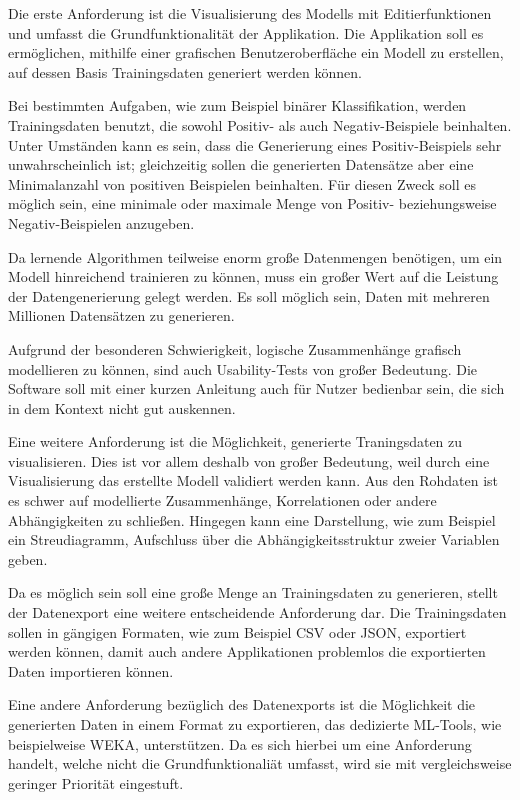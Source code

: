 Die erste Anforderung ist die Visualisierung des Modells mit Editierfunktionen und umfasst die Grundfunktionalität der Applikation. Die Applikation soll es ermöglichen, mithilfe einer grafischen Benutzeroberfläche ein Modell zu erstellen, auf dessen Basis Trainingsdaten generiert werden können.

Bei bestimmten Aufgaben, wie zum Beispiel binärer Klassifikation, werden Trainingsdaten benutzt, die sowohl Positiv- als auch Negativ-Beispiele beinhalten. Unter Umständen kann es sein, dass die Generierung eines Positiv-Beispiels sehr unwahrscheinlich ist; gleichzeitig sollen die generierten Datensätze aber eine Minimalanzahl von positiven Beispielen beinhalten. Für diesen Zweck soll es möglich sein, eine minimale oder maximale Menge von Positiv- beziehungsweise Negativ-Beispielen anzugeben.

Da lernende Algorithmen teilweise enorm große Datenmengen benötigen, um ein Modell hinreichend trainieren zu können, muss ein großer Wert auf die Leistung der Datengenerierung gelegt werden. Es soll möglich sein, Daten mit mehreren Millionen Datensätzen zu generieren.

Aufgrund der besonderen Schwierigkeit, logische Zusammenhänge grafisch modellieren zu können, sind auch Usability-Tests von großer Bedeutung. Die Software soll mit einer kurzen Anleitung auch für Nutzer bedienbar sein, die sich in dem Kontext nicht gut auskennen.

Eine weitere Anforderung ist die Möglichkeit, generierte Traningsdaten zu visualisieren. Dies ist vor allem deshalb von großer Bedeutung, weil durch eine Visualisierung das erstellte Modell validiert werden kann. Aus den Rohdaten ist es schwer auf modellierte Zusammenhänge, Korrelationen oder andere Abhängigkeiten zu schließen. Hingegen kann eine Darstellung, wie zum Beispiel ein Streudiagramm, Aufschluss über die Abhängigkeitsstruktur zweier Variablen geben.

Da es möglich sein soll eine große Menge an Trainingsdaten zu generieren, stellt der Datenexport eine weitere entscheidende Anforderung dar. Die Trainingsdaten sollen in gängigen Formaten, wie zum Beispiel CSV oder JSON, exportiert werden können, damit auch andere Applikationen problemlos die exportierten Daten importieren können.

Eine andere Anforderung bezüglich des Datenexports ist die Möglichkeit die generierten Daten in einem Format zu exportieren, das dedizierte \ac{ML}-Tools, wie beispielweise WEKA, unterstützen. Da es sich hierbei um eine Anforderung handelt, welche nicht die Grundfunktionaliät umfasst, wird sie mit vergleichsweise geringer Priorität eingestuft.

